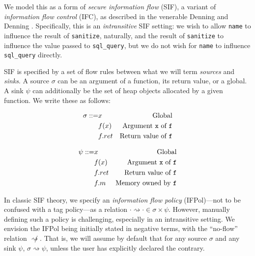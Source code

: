 \documentclass[acmsmall,review,anonymous]{acmart}\settopmatter{printfolios=true,printccs=false,printacmref=false}
\begin{document}
We model this as a form of {\em secure information flow} (SIF), a variant of
{\em information flow control} (IFC), as described in the venerable Denning and Denning
\cite{Denning77:SecureInformationFlow}.
Specifically, this is an {\it intransitive} SIF setting: we wish to allow {\tt name} to influence
the result of {\tt sanitize}, naturally, and the result of {\tt sanitize} to influence the
value passed to {\tt sql\_query}, but we do not wish for {\tt name} to influence {\tt sql\_query}
directly.

SIF is specified by a set of flow rules between what we will term {\em sources} and {\em sinks}.
A source \(\sigma\) can be an argument of a function, its return value, or a global.
A sink \(\psi\) can additionally be the set of heap objects allocated by a given function.
We write these as follows:

\begin{minipage}{0.5\textwidth}
  \[\begin{aligned}
  \sigma ::= & x & \textnormal{Global} \\
  & f(x) & \textnormal{Argument {\tt x} of {\tt f}} \\
  & f.ret & \textnormal{Return value of {\tt f}} \\
  \end{aligned}\]
\end{minipage}
\begin{minipage}{0.5\textwidth}
  \[\begin{aligned}
  \psi ::= & x & \textnormal{Global} \\
  & f(x) & \textnormal{Argument {\tt x} of {\tt f}} \\
  & f.ret & \textnormal{Return value of {\tt f}} \\
  & f.m & \textnormal{Memory owned by {\tt f}} \\
  \end{aligned}\]
\end{minipage}

In classic SIF theory, we specify an {\em information flow policy} (IFPol)---not to be confused with a
tag policy---as a relation \(\cdot \rightsquigarrow \cdot \in \sigma \times \psi\). However,
manually defining such a policy is challenging, especially in an intransitive setting.
We envision the IFPol being initially stated in negative terms, with the ``no-flow'' relation
\(\not \rightsquigarrow\). That is, we will assume by default that for any source \(\sigma\)
and any sink \(\psi\), \(\sigma \rightsquigarrow \psi\), unless the user has explicitly
declared the contrary.
\end{document}
